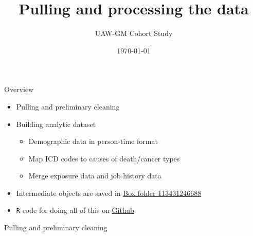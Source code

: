 \documentclass[
  ignorenonframetext,
  aspectratio=169,
]{beamer}
\title{Pulling and processing the data}
\subtitle{UAW-GM Cohort Study}
\author{}
\date{\vspace{-2.5em}\today}
\providecommand{\tightlist}{%
  \setlength{\itemsep}{0pt}\setlength{\parskip}{0pt}}
\begin{document}
\frame{\titlepage}

\begin{frame}[fragile]{Overview}
\protect\hypertarget{overview}{}

\begin{itemize}
\tightlist
\item
  Pulling and preliminary cleaning
\item
  Building analytic dataset

  \begin{itemize}
  \tightlist
  \item
    Demographic data in person-time format
  \item
    Map ICD codes to causes of death/cancer types
  \item
    Merge exposure data and job history data
  \end{itemize}
\item
  Intermediate objects are saved in
  \href{https://berkeley.app.box.com/folder/113431246688}{Box folder
  113431246688}
\item
  \texttt{R} code for doing all of this on
  \href{https://github.com/tao-feng/gm-wrangling.git}{Github}
\end{itemize}

\end{frame}

\begin{frame}{Pulling and preliminary cleaning}
\protect\hypertarget{pulling-and-preliminary-cleaning}{}

\begin{minipage}{\linewidth}
    \centering
    \begin{adjustbox}{scale = 0.7}
    
    \end{adjustbox}
\end{minipage}\vspace{1em}
\begin{minipage}{\linewidth}
    \centering
    \begin{adjustbox}{scale = 0.7}
    
    \end{adjustbox}
\end{minipage}

\end{frame}

\begin{frame}{}
\protect\hypertarget{section}{}

\begin{center}
    \begin{adjustbox}{scale = 0.7}
    
    \end{adjustbox}
\end{center}

\end{frame}
\end{document}
